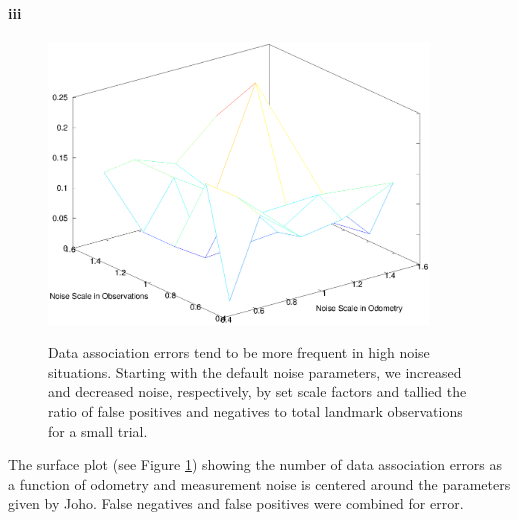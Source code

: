 \documentclass[12pt]{article}
\begin{document}
\paragraph{iii}
\begin{figure}[h!]
\centering
\includegraphics[width=0.9\textwidth]{figures/error_plot.eps}
\label{fig:assoc_err}
\caption{Data association errors tend to be more frequent in high noise situations. Starting with
the default noise parameters, we increased and decreased noise, respectively, by set scale factors
and tallied the ratio of false positives and negatives to total landmark observations for a small
trial. }
\end{figure}

The surface plot (see Figure \ref{fig:assoc_err}) showing the number of data association errors as a function of odometry and measurement noise is centered around the parameters given by Joho.  False negatives and false positives were combined for error.
\end{document}
